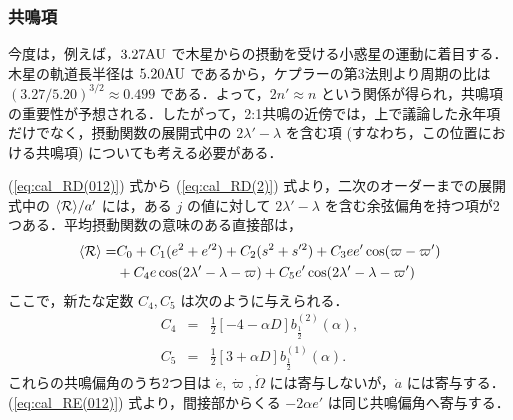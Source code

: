 \documentclass[11pt,a4paper,oneside,onecolumn]{jreport}
\begin{document}
\subsubsection{共鳴項 \label{sec:resonant}}
今度は，例えば，$3.27{\rm AU}$ で木星からの摂動を受ける小惑星の運動に着目する．木星の軌道長半径は $5.20 {\rm AU}$ であるから，ケプラーの第3法則より周期の比は $(3.27/5.20)^{3/2} \approx 0.499$ である．よって，$2 n' \approx n$ という関係が得られ，共鳴項の重要性が予想される．したがって，2:1共鳴の近傍では，上で議論した永年項だけでなく，摂動関数の展開式中の $2 \lambda' - \lambda$ を含む項 (すなわち，この位置における共鳴項) についても考える必要がある．

(\ref{eq:cal_RD(012)}) 式から (\ref{eq:cal_RD(2)}) 式より，二次のオーダーまでの展開式中の $\langle {\cal R} \rangle / a'$ には，ある $j$ の値に対して $2\lambda' - \lambda$ を含む余弦偏角を持つ項が2つある．平均摂動関数の意味のある直接部は，
\begin{equation}
\begin{split}
\langle {\cal R} \rangle = & C_0 + C_1 (e^2 + e'^2) + C_2 (s^2 + s'^2) + C_3 e e' \cos (\varpi - \varpi') \\
& + C_4 e \cos (2 \lambda' - \lambda - \varpi) + C_5 e' \cos (2 \lambda' - \lambda - \varpi')
\end{split}
\end{equation} 
ここで，新たな定数 $C_4, C_5$ は次のように与えられる．
\begin{eqnarray}
C_4 & = & \frac{1}{2} [- 4 - \alpha D] b_{\frac{1}{2}}^{(2)} (\alpha), \\
C_5 & = & \frac{1}{2} [3 + \alpha D] b_{\frac{1}{2}}^{(1)} (\alpha).
\end{eqnarray}
これらの共鳴偏角のうち2つ目は $\dot{e}, \dot{\varpi}, \dot{\Omega}$ には寄与しないが，$\dot{a}$ には寄与する．(\ref{eq:cal_RE(012)}) 式より，間接部からくる $- 2 \alpha e'$ は同じ共鳴偏角へ寄与する．
\end{document}
